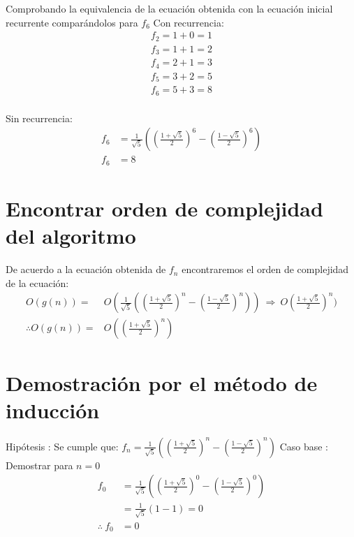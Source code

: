 \documentclass[letterpaper,11pt]{article}
\begin{document}
Comprobando la equivalencia de la ecuación obtenida con la ecuación inicial recurrente comparándolos para $f_{6}$ \smallbreak
Con recurrencia:
\begin{equation*}
\begin{aligned}
	f_{2} = 1 + 0 = 1 \\
	f_{3} = 1 + 1 = 2 \\
	f_{4} = 2 + 1 = 3 \\
	f_{5} = 3 + 2 = 5 \\
	f_{6} = 5 + 3 = 8 \\
\end{aligned}
\end{equation*}

Sin recurrencia:
\begin{equation*}
\begin{aligned}
	f_{6} &= \frac{1}{\sqrt{5}} ((\frac{1 + \sqrt{5}}{2})^{6} - (\frac{1 - \sqrt{5}}{2})^{6}) \\
	f_{6} &= 8
\end{aligned}
\end{equation*}
\newpage

\section{Encontrar orden de complejidad del algoritmo}
De acuerdo a la ecuación obtenida de $f_{n}$ encontraremos el orden de complejidad de la ecuación:
\begin{equation*}
\begin{aligned}
	O(g(n)) =& O(\frac{1}{\sqrt{5}} ((\frac{1 + \sqrt{5}}{2})^{n} - (\frac{1 - \sqrt{5}}{2})^{n})) \ \Rightarrow \ O(\frac{1 + \sqrt{5}}{2})^{n}) \\
	\therefore O(g(n)) =& O((\frac{1 + \sqrt{5}}{2})^{n})
\end{aligned}
\end{equation*}

\section{Demostración por el método de inducción}
Hipótesis : Se cumple que: $ f_{n} = \frac{1}{\sqrt{5}} ((\frac{1 + \sqrt{5}}{2})^{n} - (\frac{1 - \sqrt{5}}{2})^{n}) $ \smallbreak
Caso base : Demostrar para $ n = 0$
\begin{equation*}
\begin{aligned}
	f_{0} &= \frac{1}{\sqrt{5}} ((\frac{1 + \sqrt{5}}{2})^{0} - (\frac{1 - \sqrt{5}}{2})^{0}) \\
	&= \frac{1}{\sqrt{5}} (1 - 1) = 0 \\
	\therefore \ f_{0} &= 0
\end{aligned}
\end{equation*}
\end{document}
